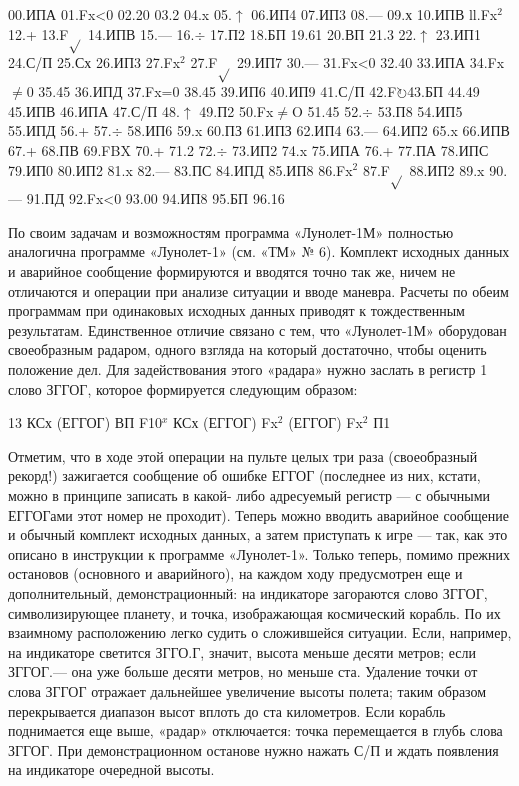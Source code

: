 \documentclass[11pt,a4paper,oneside]{article}
\def\FO{F$\circlearrowright$}
\begin{document}
00.ИПА 01.Fx<0 02.20 03.2 04.x 05.$\uparrow$ 06.ИП4 07.ИП3 08.— 09.х 10.ИПВ ll.Fx$^{2}$ 12.+ 13.F$\sqrt{}$ 14.ИПВ 15.— 16.$\div$ 17.П2 18.БП 19.61 20.ВП 21.3 22.$\uparrow$ 23.ИП1 24.С/П 25.Сх 26.ИП3 27.Fx$^{2}$
27.F$\sqrt{}$ 29.ИП7 30.— 31.Fx<0 32.40
33.ИПА 34.Fx$\neq$0 35.45 36.ИПД
37.Fx=0 38.45 39.ИП6 40.ИП9 41.С/П 42.\FO 43.БП 44.49 45.ИПВ 46.ИПА 47.С/П 48.$\uparrow$ 49.П2 50.Fx$\neq$O 51.45 
52.$\div$ 53.П8 54.ИП5 55.ИПД 56.+ 57.$\div$ 58.ИП6 59.x 60.ПЗ 61.ИПЗ 62.ИП4 63.— 64.ИП2 65.x 66.ИПВ 67.+	68.ПВ
69.FBX 70.+ 71.2 72.$\div$ 73.ИП2 74.x 75.ИПА 76.+ 77.ПА 78.ИПС 79.ИП0 80.ИП2 81.x 82.— 83.ПС 84.ИПД
85.ИП8 86.Fx$^{2}$ 87.F$\sqrt{}$ 88.ИП2 89.x
90.— 91.ПД 92.Fx<0 93.00 94.ИП8 95.БП 96.16

По своим задачам и возможностям программа «Лунолет-1М» полностью аналогична программе «Лунолет-1» (см. «ТМ» № 6). Комплект исходных данных и аварийное сообщение формируются и вводятся точно так же, ничем не отличаются и операции при анализе ситуации и вводе маневра. Расчеты по обеим программам при одинаковых исходных данных приводят к тождественным результатам. Единственное отличие связано с тем, что «Лунолет-1М» оборудован своеобразным радаром, одного взгляда на который достаточно, чтобы оценить положение дел. Для задействования этого «радара» нужно заслать в регистр 1 слово ЗГГОГ, которое формируется следующим образом:

13 КСх (ЕГГОГ) ВП F10$^{x}$ КСх (ЕГГОГ) Fx$^{2}$ (ЕГГОГ) Fx$^{2}$ П1

Отметим, что в ходе этой операции на пульте целых три раза (своеобразный рекорд!) зажигается сообщение об ошибке ЕГГОГ (последнее из них, кстати, можно в принципе записать в какой- либо адресуемый регистр — с обычными ЕГГОГами этот номер не проходит). Теперь можно вводить аварийное сообщение и обычный комплект исходных данных, а затем приступать к игре —
так, как это описано в инструкции к программе «Лунолет-1». Только теперь, помимо прежних остановов (основного и аварийного), на каждом ходу предусмотрен еще и дополнительный, демонстрационный: на индикаторе загораются слово ЗГГОГ, символизирующее планету, и точка, изображающая космический корабль. По их взаимному расположению легко судить о сложившейся ситуации. Если, например, на индикаторе светится ЗГГО.Г, значит, высота меньше десяти метров; если ЗГГОГ.— она уже больше десяти метров, но меньше ста. Удаление точки от слова ЗГГОГ отражает дальнейшее увеличение высоты полета; таким образом перекрывается диапазон высот вплоть до ста километров. Если корабль поднимается еще выше, «радар» отключается:	точка перемещается в глубь слова ЗГГОГ. При демонстрационном останове нужно нажать С/П и ждать появления на индикаторе очередной высоты.
\end{document}
